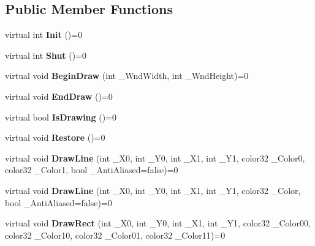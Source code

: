 \subsection*{Public Member Functions}
\begin{DoxyCompactItemize}
\item 
\hypertarget{class_i_tw_graph_a2c9d7e352e830fac67eebad7bdd271ec}{virtual int {\bfseries Init} ()=0}\label{class_i_tw_graph_a2c9d7e352e830fac67eebad7bdd271ec}

\item 
\hypertarget{class_i_tw_graph_a24193da2c81f70ef2f64b25b28cc4f47}{virtual int {\bfseries Shut} ()=0}\label{class_i_tw_graph_a24193da2c81f70ef2f64b25b28cc4f47}

\item 
\hypertarget{class_i_tw_graph_ad28401eebcee8148a43eccc4fe3c247b}{virtual void {\bfseries Begin\+Draw} (int \+\_\+\+Wnd\+Width, int \+\_\+\+Wnd\+Height)=0}\label{class_i_tw_graph_ad28401eebcee8148a43eccc4fe3c247b}

\item 
\hypertarget{class_i_tw_graph_a4d8208dce368175c92199356cf0a57a9}{virtual void {\bfseries End\+Draw} ()=0}\label{class_i_tw_graph_a4d8208dce368175c92199356cf0a57a9}

\item 
\hypertarget{class_i_tw_graph_a7d2506ffd36370b248eade5e022c0e76}{virtual bool {\bfseries Is\+Drawing} ()=0}\label{class_i_tw_graph_a7d2506ffd36370b248eade5e022c0e76}

\item 
\hypertarget{class_i_tw_graph_abb19bb13b0949fc7882fa88a0da1a82a}{virtual void {\bfseries Restore} ()=0}\label{class_i_tw_graph_abb19bb13b0949fc7882fa88a0da1a82a}

\item 
\hypertarget{class_i_tw_graph_a9bf6ce156aeb1375844db240b97badca}{virtual void {\bfseries Draw\+Line} (int \+\_\+\+X0, int \+\_\+\+Y0, int \+\_\+\+X1, int \+\_\+\+Y1, color32 \+\_\+\+Color0, color32 \+\_\+\+Color1, bool \+\_\+\+Anti\+Aliased=false)=0}\label{class_i_tw_graph_a9bf6ce156aeb1375844db240b97badca}

\item 
\hypertarget{class_i_tw_graph_ae42690b5f71d7ea1642017f91b02a29d}{virtual void {\bfseries Draw\+Line} (int \+\_\+\+X0, int \+\_\+\+Y0, int \+\_\+\+X1, int \+\_\+\+Y1, color32 \+\_\+\+Color, bool \+\_\+\+Anti\+Aliased=false)=0}\label{class_i_tw_graph_ae42690b5f71d7ea1642017f91b02a29d}

\item 
\hypertarget{class_i_tw_graph_ab1e9cc9012ee5a599339dde419c8ca88}{virtual void {\bfseries Draw\+Rect} (int \+\_\+\+X0, int \+\_\+\+Y0, int \+\_\+\+X1, int \+\_\+\+Y1, color32 \+\_\+\+Color00, color32 \+\_\+\+Color10, color32 \+\_\+\+Color01, color32 \+\_\+\+Color11)=0}\label{class_i_tw_graph_ab1e9cc9012ee5a599339dde419c8ca88}


\end{DoxyCompactItemize}
